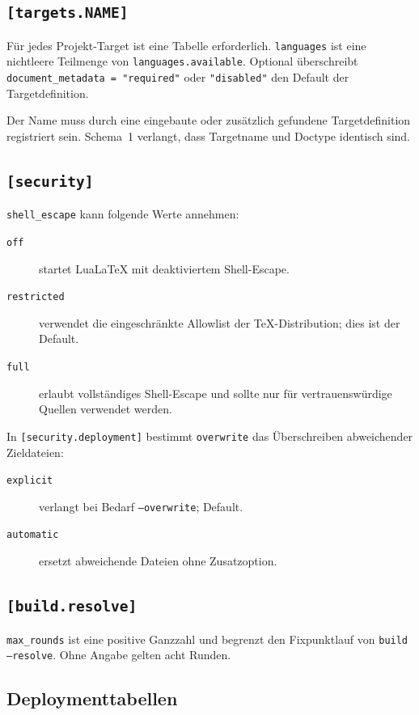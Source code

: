 \documentclass[
load-preamble+
]{osgdoc}
\begin{document}
\subsection{\texttt{[targets.NAME]}}

Für jedes Projekt-Target ist eine Tabelle erforderlich. \verb|languages| ist
eine nichtleere Teilmenge von \verb|languages.available|. Optional überschreibt
\verb|document_metadata = "required"| oder \verb|"disabled"| den Default
der Targetdefinition.

Der Name muss durch eine eingebaute oder zusätzlich gefundene Targetdefinition
registriert sein. Schema~1 verlangt, dass Targetname und Doctype identisch
sind.

\subsection{\texttt{[security]}}

\verb|shell_escape| kann folgende Werte annehmen:

\begin{description}
\item[\texttt{off}] startet LuaLaTeX mit deaktiviertem Shell-Escape.
\item[\texttt{restricted}] verwendet die eingeschränkte Allowlist der
  TeX-Distribution; dies ist der Default.
\item[\texttt{full}] erlaubt vollständiges Shell-Escape und sollte nur für
  vertrauenswürdige Quellen verwendet werden.
\end{description}

In \verb|[security.deployment]| bestimmt \verb|overwrite| das Überschreiben
abweichender Zieldateien:

\begin{description}
\item[\texttt{explicit}] verlangt bei Bedarf \texttt{--overwrite}; Default.
\item[\texttt{automatic}] ersetzt abweichende Dateien ohne Zusatzoption.
\end{description}

\subsection{\texttt{[build.resolve]}}

\verb|max_rounds| ist eine positive Ganzzahl und begrenzt den Fixpunktlauf
von \texttt{build --resolve}. Ohne Angabe gelten acht Runden.

\subsection{Deploymenttabellen}
\end{document}
